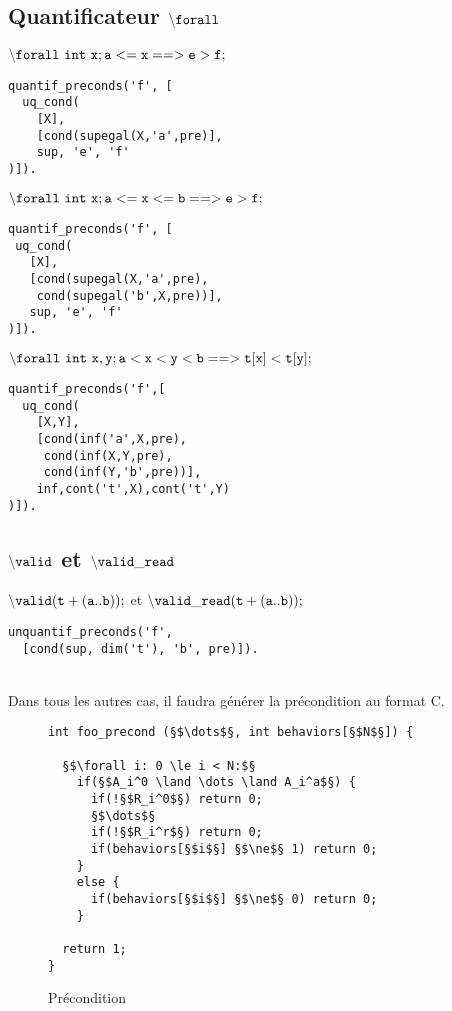 \subsection{Quantificateur ${\tt \backslash forall}$}

${\tt \backslash forall\ int\ x; a <= x ==> e > f;}$
\begin{lstlisting}
quantif_preconds('f', [
  uq_cond(    
    [X],
    [cond(supegal(X,'a',pre)],
    sup, 'e', 'f'
)]).
\end{lstlisting}

${\tt \backslash forall\ int\ x; a <= x <= b ==> e>f;}$
\begin{lstlisting}
quantif_preconds('f', [
 uq_cond(
   [X],
   [cond(supegal(X,'a',pre),
    cond(supegal('b',X,pre))],
   sup, 'e', 'f'
)]).
\end{lstlisting}

${\tt \backslash forall\ int\ x, y; a < x < y < b ==> t[x] < t[y];}$
\begin{lstlisting}
quantif_preconds('f',[
  uq_cond(
    [X,Y],
    [cond(inf('a',X,pre),
     cond(inf(X,Y,pre),
     cond(inf(Y,'b',pre))],
    inf,cont('t',X),cont('t',Y)
)]).
\end{lstlisting}

\subsection{${\tt \backslash valid}$ et ${\tt \backslash valid\_read}$}

${\tt \backslash valid(t+(a..b));}$ et ${\tt \backslash valid\_read(t+(a..b));}$
\begin{lstlisting}
unquantif_preconds('f',
  [cond(sup, dim('t'), 'b', pre)]).
\end{lstlisting}~\\


Dans tous les autres cas, il faudra générer la précondition au format C.\\

\begin{figure}[h]
  \begin{lstlisting}
int foo_precond (§$\dots$§, int behaviors[§$N$§]) {

  §$\forall i: 0 \le i < N:$§
    if(§$A_i^0 \land \dots \land A_i^a$§) {
      if(!§$R_i^0$§) return 0;
      §$\dots$§
      if(!§$R_i^r$§) return 0;
      if(behaviors[§$i$§] §$\ne$§ 1) return 0;
    }
    else {
      if(behaviors[§$i$§] §$\ne$§ 0) return 0;
    }

  return 1;
}
  \end{lstlisting}
  \caption{Précondition}
\end{figure}

